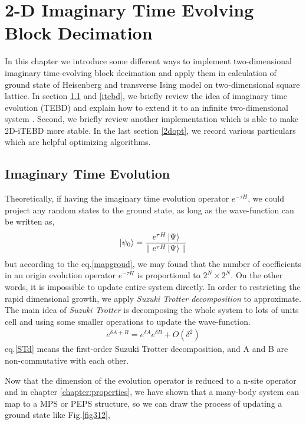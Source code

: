 \chapter{2-D Imaginary Time Evolving Block Decimation}
\label{chapter:2ditebd}

In this chapter we introduce some different ways to implement two-dimensional imaginary time-evolving block decimation and apply them in calculation of ground state of Heisenberg and transverse Ising model on two-dimensional square lattice. In section \ref{ite} and \ref{itebd}, we briefly review the idea of imaginary time evolution (TEBD) \cite{vidal_efficient_2003} \cite{vidal_efficient_2004} and explain how to extend it to an infinite two-dimensional system \cite{li_efficient_2012}. Second, we briefly review another implementation which is able to make 2D-iTEBD more stable\cite{hastings_light-cone_2009}. In the last section \ref{2dopt}, we record various particulars which are helpful optimizing algorithms.

\section{Imaginary Time Evolution}
\label{ite}
Theoretically, if having the imaginary time evolution operator $e^{-\tau H}$, we could project any random states to the ground state, as long as the wave-function can be written as,
\begin{align}
	\label{mapgroud}
	\Ket{\psi_0} = \frac{e^{\tau H} \Ket{\Psi}}{\parallel e^{\tau H} \Ket{\Psi}\parallel}
\end{align}
but according to the eq.\ref{mapgroud}, we may found that the number of coefficients in an origin evolution operator $e^{-\tau H}$ is proportional to $2^N \times 2^N$. On the other words, it is impossible to update entire system directly. In order to restricting the rapid dimensional growth, we apply \textit{Suzuki Trotter decomposition} to approximate. The main idea of \textit{Suzuki Trotter} is decomposing the whole system to lots of units cell and using some smaller operations to update the wave-function.
\begin{align}
	\label{STd}
	e^{\delta A + B} = e^{\delta A}e^{\delta B} + O(\delta^2)
\end{align}
eq.\ref{STd} means the first-order Suzuki Trotter  decomposition, and A and B are non-commutative with each other.

Now that the dimension of the evolution operator is reduced to a n-site operator and in chapter \ref{chapter:properties}, we have shown that a many-body system can map to a MPS \cite{verstraete_matrix_2006}\cite{ostlund_thermodynamic_1995}  or PEPS \cite{murg_variational_2007} structure, so we can draw the process of updating a ground state like Fig.\ref{fig312},

